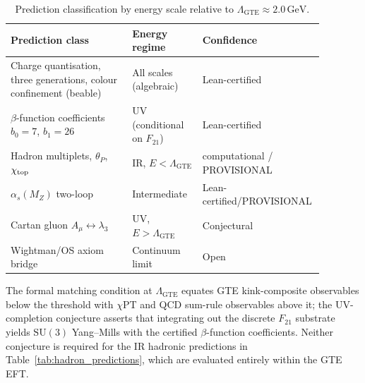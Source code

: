 \begin{table}[ht]
\centering
\caption{Prediction classification by energy scale relative to $\Lambda_{\mathrm{GTE}} \approx 2.0\,\mathrm{GeV}$.}
\label{tab:eft_classification}
\small
\begin{tabular}{@{}p{0.38\linewidth}p{0.22\linewidth}p{0.28\linewidth}@{}}
\toprule
Prediction class & Energy regime & Confidence \\
\midrule
Charge quantisation, three generations, colour confinement (beable) & All scales (algebraic) & Lean-certified \\
$\beta$-function coefficients $b_0=7$, $b_1=26$ & UV (conditional on $F_{21}$) & Lean-certified \\
Hadron multiplets, $\theta_P$, $\chi_{\rm top}$ & IR, $E < \Lambda_{\mathrm{GTE}}$ & computational / PROVISIONAL \\
$\alpha_s(M_Z)$ two-loop & Intermediate & Lean-certified/PROVISIONAL \\
Cartan gluon $A_\mu \leftrightarrow \lambda_3$ & UV, $E > \Lambda_{\mathrm{GTE}}$ & Conjectural \\
Wightman/OS axiom bridge & Continuum limit & Open \\
\bottomrule
\end{tabular}
\end{table}

The formal matching condition at $\Lambda_{\mathrm{GTE}}$ equates GTE kink-composite observables below the threshold with $\chi$PT and QCD sum-rule observables above it; the UV-completion conjecture asserts that integrating out the discrete $F_{21}$ substrate yields $\mathrm{SU}(3)$ Yang--Mills with the certified $\beta$-function coefficients.
Neither conjecture is required for the IR hadronic predictions in Table~\ref{tab:hadron_predictions}, which are evaluated entirely within the GTE EFT.
